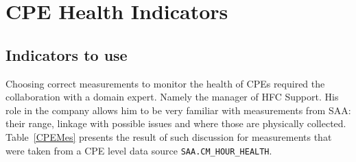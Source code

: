 \section{CPE Health Indicators}
\subsection{Indicators to use}
Choosing correct measurements to monitor the health of CPEs required the collaboration with a domain expert. Namely the manager of HFC Support. His role in the company allows him to be very familiar with measurements from SAA: their range, linkage with possible issues and where those are physically collected. Table~\ref{CPEMes} presents the result of such discussion for measurements that were taken from a CPE level data source \texttt{SAA.CM\_HOUR\_HEALTH}.

